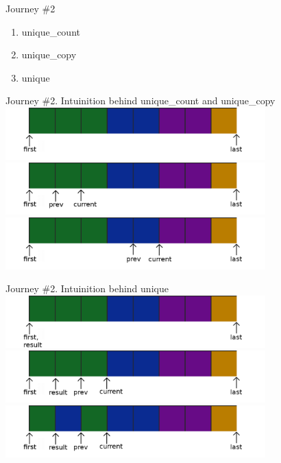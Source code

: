 \documentclass[10pt]{beamer}
\begin{document}
\begin{frame}{Journey \#2}
    \begin{enumerate}
        \item unique\_count
        \item unique\_copy
        \item unique
    \end{enumerate}
\end{frame}

\begin{frame}{Journey \#2. Intuinition behind unique\_count and unique\_copy}
    \includegraphics[height=2cm]{images/sequence.png}
    \includegraphics[height=2cm]{images/sequence2.png}
    \includegraphics[height=2cm]{images/sequence3.png}
\end{frame}

\begin{frame}{Journey \#2. Intuinition behind unique}
    \includegraphics[height=2cm]{images/sequence-1-3-1.png}
    \includegraphics[height=2cm]{images/sequence-1-3-2.png}
    \includegraphics[height=2cm]{images/sequence-1-3-3.png}
\end{frame}
\end{document}
